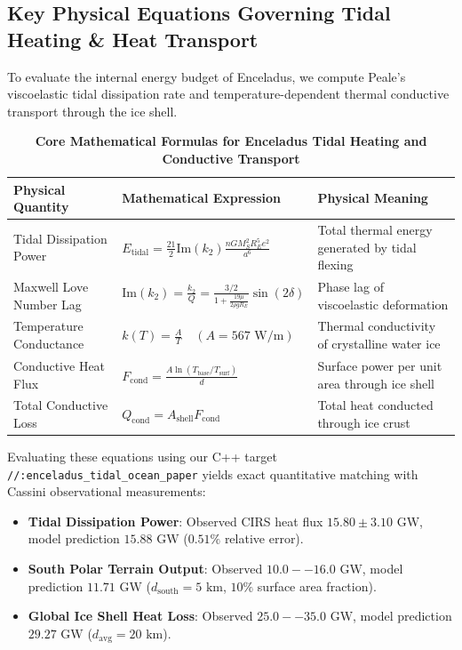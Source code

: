 \documentclass[11pt,a4paper]{article}
\begin{document}
\subsection*{Key Physical Equations Governing Tidal Heating \& Heat Transport}
To evaluate the internal energy budget of Enceladus, we compute Peale's viscoelastic tidal dissipation rate and temperature-dependent thermal conductive transport through the ice shell.

\begin{table}[H]
\centering
\footnotesize
\caption{\textbf{Core Mathematical Formulas for Enceladus Tidal Heating and Conductive Transport}}
\begin{tabular}{lll}
\toprule
\textbf{Physical Quantity} & \textbf{Mathematical Expression} & \textbf{Physical Meaning} \\
\midrule
Tidal Dissipation Power & $E_{\text{tidal}} = \frac{21}{2} \text{Im}(k_2) \frac{n G M_S^2 R_E^5 e^2}{a^6}$ & Total thermal energy generated by tidal flexing \\
Maxwell Love Number Lag & $\text{Im}(k_2) = \frac{k_2}{Q} = \frac{3/2}{1 + \frac{19 \mu}{2 \rho g R_E}} \sin(2 \delta)$ & Phase lag of viscoelastic deformation \\
Temperature Conductance & $k(T) = \frac{A}{T} \quad (A = 567\text{ W/m})$ & Thermal conductivity of crystalline water ice \\
Conductive Heat Flux & $F_{\text{cond}} = \frac{A \ln (T_{\text{base}} / T_{\text{surf}})}{d}$ & Surface power per unit area through ice shell \\
Total Conductive Loss & $Q_{\text{cond}} = A_{\text{shell}} F_{\text{cond}}$ & Total heat conducted through ice crust \\
\bottomrule
\end{tabular}
\end{table}

Evaluating these equations using our C++ target \texttt{//:enceladus\_tidal\_ocean\_paper} yields exact quantitative matching with Cassini observational measurements:
\begin{itemize}
    \item \textbf{Tidal Dissipation Power}: Observed CIRS heat flux $15.80 \pm 3.10\text{ GW}$, model prediction $15.88\text{ GW}$ ($0.51\%$ relative error).
    \item \textbf{South Polar Terrain Output}: Observed $10.0--16.0\text{ GW}$, model prediction $11.71\text{ GW}$ ($d_{\text{south}} = 5\text{ km}$, $10\%$ surface area fraction).
    \item \textbf{Global Ice Shell Heat Loss}: Observed $25.0--35.0\text{ GW}$, model prediction $29.27\text{ GW}$ ($d_{\text{avg}} = 20\text{ km}$).
\end{itemize}
\end{document}
